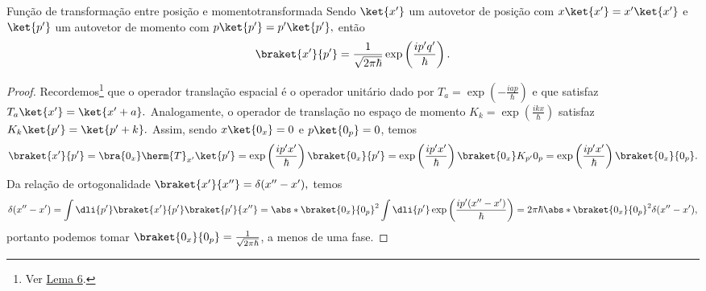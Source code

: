 \begin{lemma}{Função de transformação entre posição e momento}{transformada}
   Sendo \(\ket{x'}\) um autovetor de posição com \(x\ket{x'} = x' \ket{x'}\) e \(\ket{p'}\) um autovetor de momento com \(p\ket{p'} = p' \ket{p'},\) então
   \begin{equation*}
      \braket{x'}{p'} = \frac{1}{\sqrt{2\pi \hbar}} \exp\left(\frac{i p' q'}{\hbar}\right).
   \end{equation*}
\end{lemma}
\begin{proof}
   Recordemos\footnote{Ver \href{https://github.com/louisradial/4305001-mecanica-quantica/releases/tag/lista2}{Lema 6}.} que o operador translação espacial é o operador unitário dado por \(T_a = \exp\left(-\frac{i a p}{\hbar}\right)\) e que satisfaz \(T_a\ket{x'} = \ket{x' + a}.\) Analogamente, o operador de translação no espaço de momento \(K_k = \exp\left(\frac{i k x}{\hbar}\right)\) satisfaz \(K_k\ket{p'} = \ket{p' + k}.\) Assim, sendo \(x\ket{0_x} = 0\) e \(p \ket{0_p} = 0\), temos
   \begin{equation*}
      \braket{x'}{p'} = \bra{0_x} \herm{T}_{x'} \ket{p'} = \exp\left(\frac{i p' x'}{\hbar}\right)\braket{0_x}{p'} = \exp\left(\frac{i p' x'}{\hbar}\right)\braket{0_x}K_{p'}{0_p} = \exp\left(\frac{i p' x'}{\hbar}\right) \braket{0_x}{0_p}.
   \end{equation*}
   Da relação de ortogonalidade \(\braket{x'}{x''} = \delta(x'' - x'),\) temos
   \begin{equation*}
      \delta(x'' - x') = \int \dli{p'} \braket{x'}{p'}\braket{p'}{x''} = \abs*{\braket{0_x}{0_p}}^2\int \dli{p'} \exp\left(\frac{i p' (x'' - x')}{\hbar}\right) = 2\pi \hbar \abs*{\braket{0_x}{0_p}}^2 \delta(x'' - x'),
   \end{equation*}
   portanto podemos tomar \(\braket{0_x}{0_p} = \frac{1}{\sqrt{2\pi \hbar}}\), a menos de uma fase.
\end{proof}

